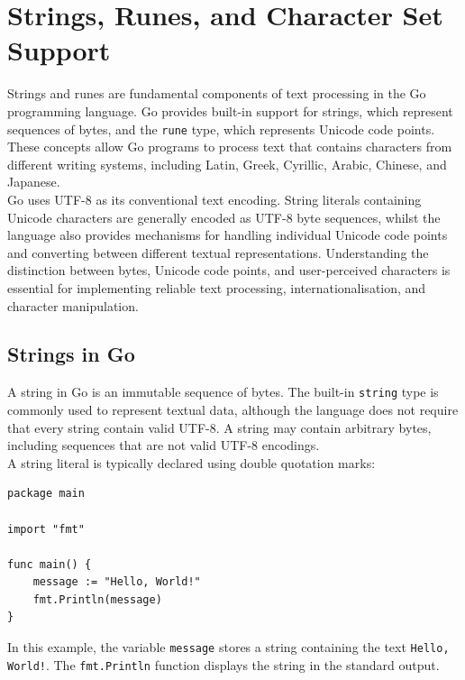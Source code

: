 \section{Strings, Runes, and Character Set Support}

Strings and runes are fundamental components of text processing in the Go programming language. Go provides built-in support for strings, which represent sequences of bytes, and the \texttt{rune} type, which represents Unicode code points. These concepts allow Go programs to process text that contains characters from different writing systems, including Latin, Greek, Cyrillic, Arabic, Chinese, and Japanese.\\

Go uses UTF-8 as its conventional text encoding. String literals containing Unicode characters are generally encoded as UTF-8 byte sequences, whilst the language also provides mechanisms for handling individual Unicode code points and converting between different textual representations. Understanding the distinction between bytes, Unicode code points, and user-perceived characters is essential for implementing reliable text processing, internationalisation, and character manipulation.

\subsection{Strings in Go}

A string in Go is an immutable sequence of bytes. The built-in \texttt{string} type is commonly used to represent textual data, although the language does not require that every string contain valid UTF-8. A string may contain arbitrary bytes, including sequences that are not valid UTF-8 encodings.\\

A string literal is typically declared using double quotation marks:

\begin{lstlisting}
package main

import "fmt"

func main() {
    message := "Hello, World!"
    fmt.Println(message)
}
\end{lstlisting}

In this example, the variable \texttt{message} stores a string containing the text \texttt{Hello, World!}. The \texttt{fmt.Println} function displays the string in the standard output.\\

